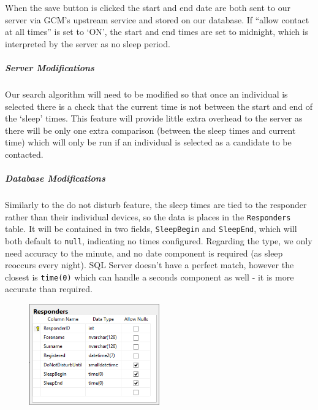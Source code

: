 \documentclass{article}
\begin{document}
When the save button is clicked the start and end date are both sent to our server via GCM’s upstream service and stored on our database. If “allow contact at all times” is set to ‘ON’, the start and end times are set to midnight, which is interpreted by the server as no sleep period.

\subparagraph{Server Modifications}
Our search algorithm will need to be modified so that once an individual is selected there is a check that the current time is not between the start and end of the ‘sleep’ times. This feature will provide little extra overhead to the server as there will be only one extra comparison (between the sleep times and current time) which will only be run if an individual is selected as a candidate to be contacted.
\subparagraph{Database Modifications}
Similarly to the do not disturb feature, the sleep times are tied to the responder rather than their individual devices, so the data is places in the \texttt{\color{OliveGreen}Responders} table. It will be contained in two fields, \texttt{\color{OliveGreen}SleepBegin} and \texttt{\color{OliveGreen}SleepEnd}, which will both default to \texttt{\color{OliveGreen}null}, indicating no times configured. Regarding the type, we only need accuracy to the minute, and no date component is required (as sleep reoccurs every night). SQL Server doesn’t have a perfect match, however the closest is \texttt{\color{OliveGreen}time(0)} which can handle a seconds component as well - it is more accurate than required.
	\begin{figure}[H]
		\centering
		\includegraphics[width=0.5\textwidth]{"Iteration5/iteration-5-sleep"}
	\end{figure}
\end{document}

